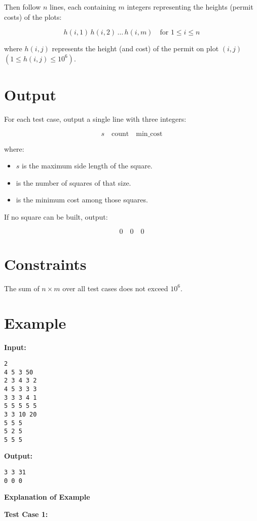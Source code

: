 \documentclass{article}
\begin{document}
Then follow $n$ lines, each containing $m$ integers representing the heights (permit costs) of the plots:

\[
h(i,1) \, h(i,2) \, \dots \, h(i,m) \quad \text{for } 1 \leq i \leq n
\]

where $h(i,j)$ represents the height (and cost) of the permit on plot $(i,j)$ $(1 \leq h(i,j) \leq 10^6)$.

\section*{Output}

For each test case, output a single line with three integers:

$$ s \quad \text{count} \quad \text{min\_cost} $$

where:
\begin{itemize}
    \item $s$ is the maximum side length of the square.
    \item {} is the number of squares of that size.
    \item {} is the minimum cost among those squares.
\end{itemize}

If no square can be built, output:

\[
0 \quad 0 \quad 0
\]

\section*{Constraints}
The sum of $n \times m$ over all test cases does not exceed $10^6$.

\section*{Example}

\noindent \textbf{Input:}

\begin{verbatim}
2
4 5 3 50
2 3 4 3 2
4 5 3 3 3
3 3 3 4 1
5 5 5 5 5
3 3 10 20
5 5 5
5 2 5
5 5 5
\end{verbatim}

\noindent \textbf{Output:}

\begin{verbatim}
3 3 31
0 0 0
\end{verbatim}

\noindent\large\textbf{Explanation of Example}

\noindent \textbf{Test Case 1:}
\end{document}
